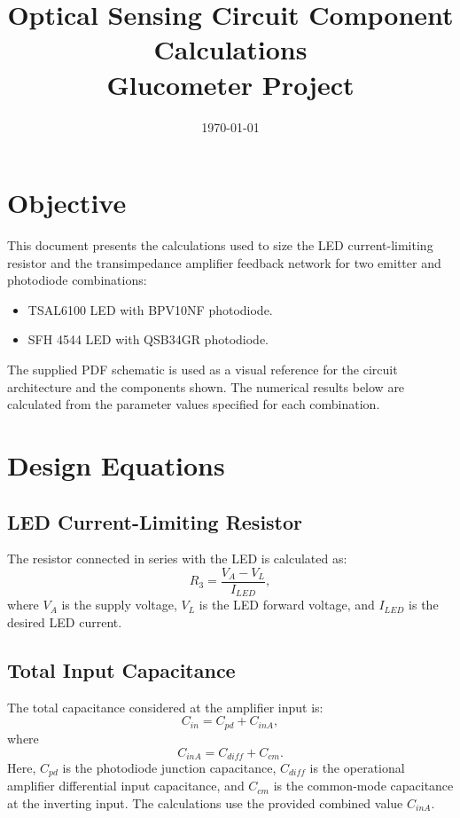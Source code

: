 \documentclass[12pt,a4paper]{article}
\title{Optical Sensing Circuit Component Calculations\\
\large Glucometer Project}
\author{}
\date{\today}
\begin{document}
\maketitle

\section{Objective}
This document presents the calculations used to size the LED current-limiting
resistor and the transimpedance amplifier feedback network for two emitter
and photodiode combinations:
\begin{itemize}
  \item TSAL6100 LED with BPV10NF photodiode.
  \item SFH 4544 LED with QSB34GR photodiode.
\end{itemize}

The supplied PDF schematic is used as a visual reference for the circuit
architecture and the components shown. The numerical results below are
calculated from the parameter values specified for each combination.

\section{Design Equations}

\subsection{LED Current-Limiting Resistor}
The resistor connected in series with the LED is calculated as:
\begin{equation}
  R_3 = \frac{V_A - V_L}{I_{LED}},
  \label{eq:rled}
\end{equation}
where $V_A$ is the supply voltage, $V_L$ is the LED forward voltage, and
$I_{LED}$ is the desired LED current.

\subsection{Total Input Capacitance}
The total capacitance considered at the amplifier input is:
\begin{equation}
  C_{in} = C_{pd} + C_{inA},
  \label{eq:cin}
\end{equation}
where
\begin{equation}
  C_{inA} = C_{diff} + C_{cm}.
\end{equation}
Here, $C_{pd}$ is the photodiode junction capacitance, $C_{diff}$ is the
operational amplifier differential input capacitance, and $C_{cm}$ is the
common-mode capacitance at the inverting input. The calculations use the
provided combined value $C_{inA}$.
\end{document}
